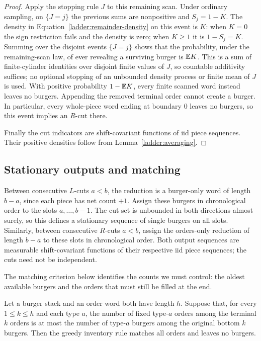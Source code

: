 \begin{proof}
Apply the stopping rule $J$ to this remaining scan.
Under ordinary sampling, on $\{J=j\}$ the previous sums are nonpositive
and $S_j=1-K$.
The density in Equation~\eqref{ladder:remainder-density} on this event is
$K$: when $K=0$ the sign restriction fails and the density is zero;
when $K\ge1$ it is $1-S_j=K$.
Summing over the disjoint events $\{J=j\}$ shows that the probability,
under the remaining-scan law, of ever revealing a surviving burger is
$\mathbb E K$. This is a sum of finite-cylinder identities over disjoint
finite values of $J$, so countable additivity suffices; no optional
stopping of an unbounded density process or finite mean of $J$ is used.
With positive probability $1-\mathbb E K$, every finite scanned word instead
leaves no burgers. Appending the removed terminal order cannot create a
burger. In particular, every whole-piece word ending at boundary $0$
leaves no burgers, so this event implies an $R$-cut there.

Finally the cut indicators are shift-covariant functions of iid piece
sequences. Their positive densities follow from
Lemma~\ref{ladder:averaging}.
\end{proof}

\subsection{Stationary outputs and matching}

Between consecutive $L$-cuts $a<b$, the reduction is a burger-only word
of length $b-a$, since each piece has net count $+1$.
Assign these burgers in chronological order to the slots
$a,\ldots,b-1$.
The cut set is unbounded in both directions almost surely, so this
defines a stationary sequence of single burgers on all slots.
Similarly, between consecutive $R$-cuts $a<b$, assign the orders-only
reduction of length $b-a$ to these slots in chronological order.
Both output sequences are measurable shift-covariant functions of their
respective iid piece sequences; the cuts need not be independent.

The matching criterion below identifies the counts we must control:
the oldest available burgers and the orders that must still be filled
at the end.

\begin{lemma}
\label{ladder:matching}
Let a burger stack and an order word both have length $h$.
Suppose that, for every $1\le k\le h$ and each type $a$, the number of
fixed type-$a$ orders among the terminal $k$ orders is at most the number
of type-$a$ burgers among the original bottom $k$ burgers.
Then the greedy inventory rule matches all orders and leaves no burgers.
\end{lemma}

